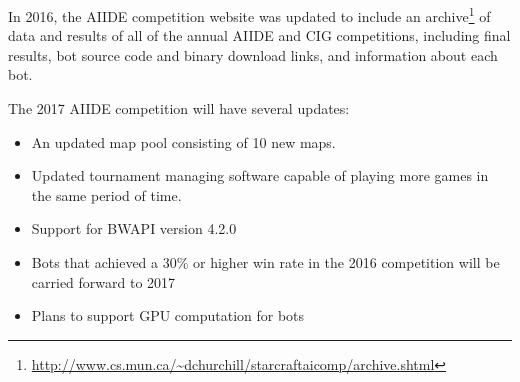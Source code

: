 In 2016, the AIIDE competition website was updated to include an archive\footnote{\url{http://www.cs.mun.ca/~dchurchill/starcraftaicomp/archive.shtml}} of data and results of all of the annual AIIDE and CIG competitions, including final results, bot source code and binary download links, and information about each bot. 

The 2017 AIIDE competition will have several updates:

\begin{itemize}
\item An updated map pool consisting of 10 new maps.
\item Updated tournament managing software capable of playing more games in the same period of time.
\item Support for BWAPI version 4.2.0
\item Bots that achieved a 30\% or higher win rate in the 2016 competition will be carried forward to 2017
\item Plans to support GPU computation for bots
\end{itemize}

\vskip 6mm